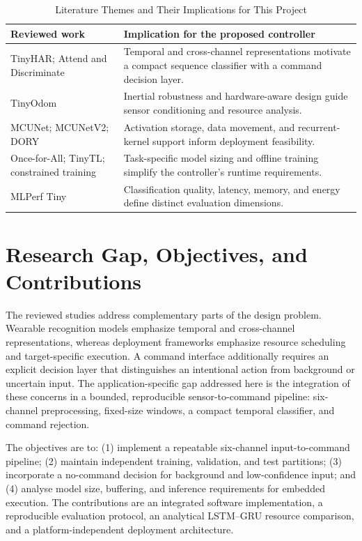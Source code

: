 \documentclass[conference]{IEEEtran}
\begin{document}
\begin{table}[t]
\caption{Literature Themes and Their Implications for This Project}
\label{tab:literature}\centering\small
\begin{tabular}{@{}>{\raggedright\arraybackslash}p{}>{\raggedright\arraybackslash}p{}@{}}
\toprule
Reviewed work & Implication for the proposed controller\\
\midrule
TinyHAR; Attend and Discriminate \cite{tinyhar,attend} & Temporal and cross-channel representations motivate a compact sequence classifier with a command decision layer.\\
TinyOdom \cite{tinyodom} & Inertial robustness and hardware-aware design guide sensor conditioning and resource analysis.\\
MCUNet; MCUNetV2; DORY \cite{mcunet,mcunetv2,dory} & Activation storage, data movement, and recurrent-kernel support inform deployment feasibility.\\
Once-for-All; TinyTL; constrained training \cite{onceforall,tinytl,tinytraining} & Task-specific model sizing and offline training simplify the controller's runtime requirements.\\
MLPerf Tiny \cite{mlperf} & Classification quality, latency, memory, and energy define distinct evaluation dimensions.\\
\bottomrule
\end{tabular}
\end{table}

\section{Research Gap, Objectives, and Contributions}
The reviewed studies address complementary parts of the design problem. Wearable recognition models emphasize temporal and cross-channel representations, whereas deployment frameworks emphasize resource scheduling and target-specific execution. A command interface additionally requires an explicit decision layer that distinguishes an intentional action from background or uncertain input. The application-specific gap addressed here is the integration of these concerns in a bounded, reproducible sensor-to-command pipeline: six-channel preprocessing, fixed-size windows, a compact temporal classifier, and command rejection.

The objectives are to: (1) implement a repeatable six-channel input-to-command pipeline; (2) maintain independent training, validation, and test partitions; (3) incorporate a no-command decision for background and low-confidence input; and (4) analyse model size, buffering, and inference requirements for embedded execution. The contributions are an integrated software implementation, a reproducible evaluation protocol, an analytical LSTM--GRU resource comparison, and a platform-independent deployment architecture.
\end{document}

